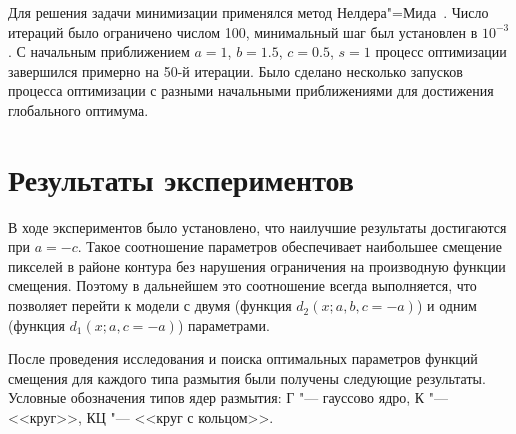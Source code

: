 Для решения задачи минимизации применялся метод Нелдера"=Мида~\cite{10.1093/comjnl/7.4.308}. Число итераций было ограничено числом 100, минимальный шаг был установлен в $10^{-3}$. С начальным приближением $a=1$, $b=1.5$, $c=0.5$, $s=1$ процесс оптимизации завершился примерно на 50-й итерации. Было сделано несколько запусков процесса оптимизации с разными начальными приближениями для достижения глобального оптимума.

\section{Результаты экспериментов}

В ходе экспериментов было установлено, что наилучшие результаты достигаются при $a=-c$. Такое соотношение параметров обеспечивает наибольшее смещение пикселей в районе контура без нарушения ограничения на производную функции смещения. Поэтому в дальнейшем это соотношение всегда выполняется, что позволяет перейти к модели с двумя (функция $d_2(x;a,b,c=-a)$) и одним (функция $d_1(x;a,c=-a)$) параметрами.

После проведения исследования и поиска оптимальных параметров функций смещения для каждого типа размытия были получены следующие результаты. Условные обозначения типов ядер размытия: Г "--- гауссово ядро, К "--- <<круг>>, КЦ "--- <<круг с кольцом>>.





